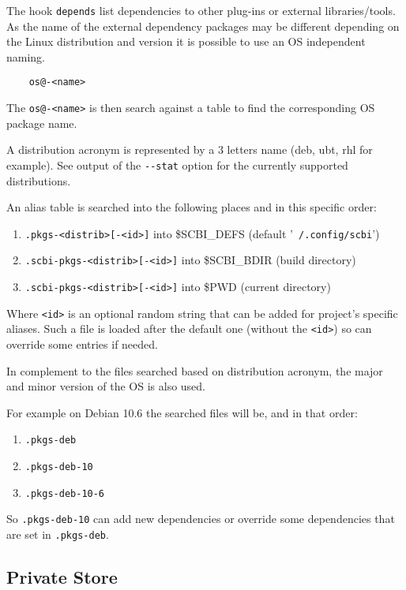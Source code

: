 \documentclass[a4paper,12pt,twoside]{article}
\newcommand{\code}[1]{\texttt{#1}}
\newcommand{\file}[1]{'{\texttt{#1}}'}
\newcommand{\ddash}{-{}-}
\begin{document}
The hook \code{depends} list dependencies to other plug-ins or external libraries/tools. As the name of the external dependency packages may be different depending on the Linux distribution and version it is possible to use an OS independent naming.

\begin{lstlisting}
	os@-<name>
\end{lstlisting}

The \code{os@-<name>} is then search against a table to find the corresponding OS package name.

A distribution acronym is represented by a 3 letters name (deb, ubt, rhl for example). See output of the \code{\ddash{}stat} option for the currently supported distributions.

An alias table is searched into the following places and in this specific order:

\begin{enumerate}
	\item \code{.pkgs-<distrib>[-<id>]} into \$SCBI\_DEFS (default \file{~/.config/scbi})
	\item \code{.scbi-pkgs-<distrib>[-<id>]} into \$SCBI\_BDIR (build directory)
	\item \code{.scbi-pkgs-<distrib>[-<id>]} into \$PWD (current directory)
\end{enumerate}

Where \code{<id>} is an optional random string that can be added for project's specific aliases. Such a file is loaded after the default one (without the \code{<id>}) so can override some entries if needed.

In complement to the files searched based on distribution acronym, the major and minor version of the OS is also used.

For example on Debian 10.6 the searched files will be, and in that order:

\begin{enumerate}
	\item \code{.pkgs-deb}
	\item \code{.pkgs-deb-10}
	\item \code{.pkgs-deb-10-6}
\end{enumerate}

So \code{.pkgs-deb-10} can add new dependencies or override some dependencies that are set in \code{.pkgs-deb}.

\subsection{Private Store}
\end{document}
